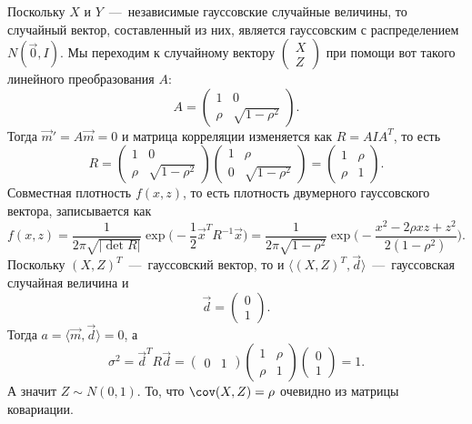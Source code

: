 \begin{solution}
    Поскольку $X$ и $Y$~---~независимые гауссовские случайные величины, то случайный вектор, составленный из них, является гауссовским с распределением $N(\vec{0}, I)$.
    Мы переходим к случайному вектору $\begin{pmatrix*} X \\ Z
    \end{pmatrix*}$ при помощи вот такого линейного преобразования $A$:
    \[
        A = \begin{pmatrix*} 1 & 0 \\ \rho & \sqrt {1- \rho^2}
        \end{pmatrix*}.
    \]
    Тогда $\vec{m}' = A\vec{m} = 0$ и матрица корреляции изменяется как $R = AIA^T$, то есть
    \[
        R = \begin{pmatrix*} 1 & 0 \\ \rho & \sqrt {1 - \rho^2}
        \end{pmatrix*} \begin{pmatrix*} 1 & \rho \\ 0 & \sqrt {1 - \rho^2}
        \end{pmatrix*} = \begin{pmatrix*}
                             1 & \rho \\ \rho & 1
        \end{pmatrix*}.
    \]
    Совместная плотность $f(x, z)$, то есть плотность двумерного гауссовского вектора, записывается как
    \[
        f(x, z) = \dfrac{1}{2\pi \sqrt {|\det R|}} \exp \biggr(-\dfrac{1}{2} \vec{x}^T R^{-1} \vec{x} \biggr) = \dfrac{1}{2\pi \sqrt {1 - \rho^2}} \exp \biggr(-\dfrac{x^2 - 2\rho xz + z^2}{2(1 - \rho^2)}\biggr).
    \]
    Поскольку $(X, Z)^T$~---~гауссовский вектор, то и $\langle (X, Z)^T, \vec{d} \rangle$~---~гауссовская случайная величина и \[\vec{d} = \begin{pmatrix*} 0 \\ 1
    \end{pmatrix*}.\]
    Тогда $a = \langle \vec{m}, \vec{d} \rangle = 0$, а \[\sigma^2 = \vec{d}^T R \vec{d} = \begin{pmatrix*} 0 & 1
    \end{pmatrix*} \begin{pmatrix*} 1 & \rho \\ \rho & 1
    \end{pmatrix*} \begin{pmatrix*} 0 \\ 1
    \end{pmatrix*} = 1.\]
    А значит $Z \sim N(0, 1)$. То, что $\cov(X, Z) = \rho$ очевидно из матрицы ковариации.
\end{solution}